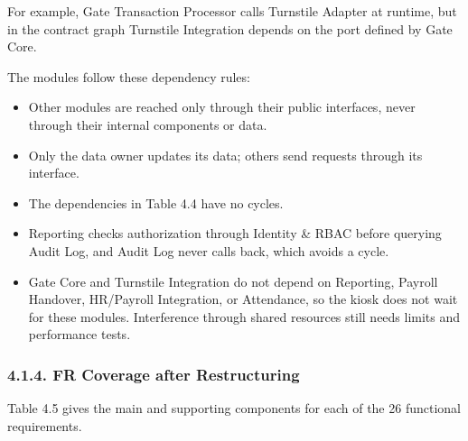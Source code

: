 For example, Gate Transaction Processor calls Turnstile Adapter at runtime, but in the contract graph Turnstile Integration depends on the port defined by Gate Core.

The modules follow these dependency rules:

\begin{itemize}[leftmargin=36pt, itemsep=2pt, topsep=4pt, parsep=2pt]

  \item Other modules are reached only through their public interfaces, never through their internal components or data.

  \item Only the data owner updates its data; others send requests through its interface.

  \item The dependencies in Table 4.4 have no cycles.

  \item Reporting checks authorization through Identity \& RBAC before querying Audit Log, and Audit Log never calls back, which avoids a cycle.

  \item Gate Core and Turnstile Integration do not depend on Reporting, Payroll Handover, HR/Payroll Integration, or Attendance, so the kiosk does not wait for these modules. Interference through shared resources still needs limits and performance tests.

\end{itemize}

\subsubsection*{4.1.4. FR Coverage after Restructuring}

{}


Table 4.5 gives the main and supporting components for each of the 26 functional requirements.

